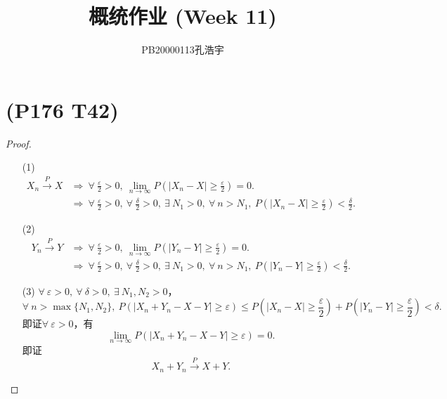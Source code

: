 \documentclass{article}
\title{概统作业 (Week 11)}
\author{PB20000113孔浩宇}
\begin{document}
\maketitle
\section{(P176 T42)}  %
\begin{proof}
    \begin{enumerate}
        \item []
        \item [(1)]
        \begin{align*}
            X_n \xrightarrow{P} X     
            &\Rightarrow\ 
            \forall\ \frac{\varepsilon}{2} >0,\ \lim\limits_{n \to \infty} P(|X_n - X|\geq \frac{\varepsilon}{2}) = 0.\\
            &\Rightarrow\ 
            \forall\ \frac{\varepsilon}{2} >0,\ \forall\ \frac{\delta}{2} >0 ,\ \exists\ N_1 >0,\ \forall\ n>N_1,\ P(|X_n - X|\geq \frac{\varepsilon}{2}) < \frac{\delta}{2}.
        \end{align*}
        \item [(2)]
        \begin{align*}
            Y_n \xrightarrow{P} Y     
            &\Rightarrow\ 
            \forall\ \frac{\varepsilon}{2} >0,\ \lim\limits_{n \to \infty} P(|Y_n - Y|\geq \frac{\varepsilon}{2}) = 0.\\
            &\Rightarrow\ 
            \forall\ \frac{\varepsilon}{2} >0,\ \forall\ \frac{\delta}{2} >0 ,\ \exists\ N_1 >0,\ \forall\ n>N_1,\ P(|Y_n - Y|\geq \frac{\varepsilon}{2}) <  \frac{\delta}{2}.
        \end{align*}
        \item [(3)]$\forall\ \varepsilon >0,\ \forall\ \delta >0,\ \exists\ N_1 , N_2 >0$，
        \[
            \forall\ n>\max\{N_1 , N_2\},\ 
            P(|X_n + Y_n - X - Y|\geq \varepsilon) 
            \leq
            P(|X_n - X|\geq \frac{\varepsilon}{2}) + P(|Y_n - Y|\geq \frac{\varepsilon}{2})  
            < \delta.  
        \]
        即证$\forall\ \varepsilon >0$，有
        \[
            \lim\limits_{n \to \infty} P(|X_n + Y_n - X - Y|\geq \varepsilon) = 0.
        \]
        即证
        \[
            X_n + Y_n \xrightarrow{P} X + Y .     
        \]
    \end{enumerate}
\end{proof}
\end{document}
